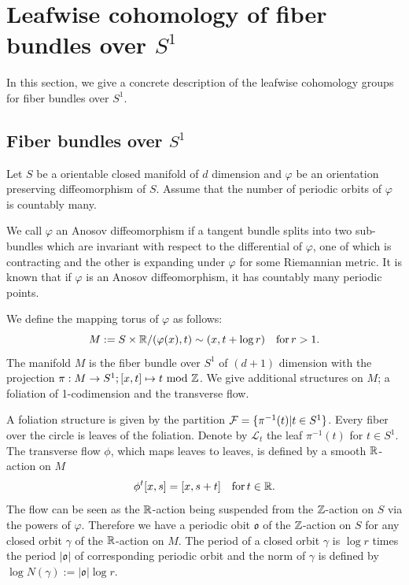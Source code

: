 \section{Leafwise cohomology of fiber bundles over \texorpdfstring{$S^{1}$}{}}\label{section2}

In this section, we give a concrete description of the leafwise cohomology groups for fiber bundles over $S^{1}$.

\subsection{Fiber bundles over \texorpdfstring{$S^{1}$}{}}

Let $S$ be a orientable closed manifold of $d$ dimension and $\varphi$ be an orientation preserving diffeomorphism of $S$.
Assume that the number of periodic orbits of $\varphi$ is countably many.

\begin{example}
We call $\varphi$ an Anosov diffeomorphism if a tangent bundle splits into two sub-bundles which are invariant with respect to the differential of  $\varphi$, one of which is contracting and the other is expanding under $\varphi$ for some Riemannian metric.
It is known that if $\varphi$ is an Anosov diffeomorphism, it has countably many periodic points.

\end{example}

We define the mapping torus of $\varphi$ as follows:
\begin{equation} \label{eq:3.1}
    M:=S \times {\mathbb{R}} / (\varphi(x),t) \sim (x,t+\log{r})\quad\mathrm{for}\, r>1.
\end{equation}
The manifold $M$ is the fiber bundle over $S^{1}$ of $(d+1)$ dimension with the projection $\pi : M \rightarrow S^{1};[x,t]\mapsto{t\mbox{ mod }{\mathbb{Z}}}$.
We give additional structures on $M$; a foliation of 1-codimension and the transverse flow.

A foliation structure is given by the partition ${\mathcal{F}}=\{ \pi^{-1}(t) | t\in{S^{1}} \}$. Every fiber over the circle is leaves of the foliation.
Denote by $\mathcal{L}_{t}$ the leaf $\pi^{-1}(t)$ for $t\in{S^{1}}$.
The transverse flow $\phi$, which maps leaves to leaves, is defined by a smooth ${\mathbb{R}}$-action on $M$
\begin{equation*}
    \phi^{t}[x,s] = [x, s+ t]\quad\mbox{for}\,t\in{\mathbb{R}}.
\end{equation*}
The flow can be seen as the ${\mathbb{R}}$-action being suspended from the ${\mathbb{Z}}$-action on $S$ via the powers of $\varphi$.
Therefore we have a periodic obit $\mathfrak{o}$ of the ${\mathbb{Z}}$-action on $S$ for any closed orbit $\gamma$ of the ${\mathbb{R}}$-action on $M$.
The period of a closed orbit $\gamma$ is $\log{r}$ times the period $|\mathfrak{o}|$ of corresponding periodic orbit and the norm of $\gamma$ is defined by $\log N(\gamma):=|\mathfrak{o}|\log{r}$.



